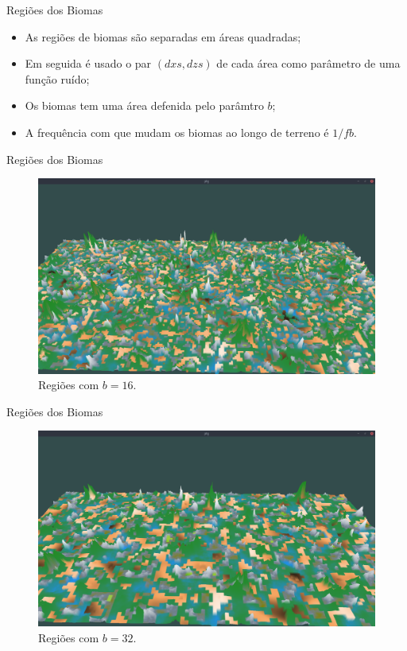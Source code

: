 \begin{frame}{Regiões dos Biomas}
    \begin{itemize} \setlength\itemsep{1em}
        \item As regiões de biomas são separadas em áreas quadradas;
        \item Em seguida é usado o par $(dxs, dzs)$ de cada área como parâmetro 
        de uma função ruído;
        \item Os biomas tem uma área defenida pelo parâmtro $b$;
        \item A frequência com que mudam os biomas ao longo de terreno 
        é $1/fb$.
    \end{itemize}
\end{frame}

\begin{frame}{Regiões dos Biomas}
    \begin{figure}[H]
        \centering
        \includegraphics[width=.9\textwidth]{img/re2bfb/b/16f4.png}
        \caption{Regiões com $b = 16$.}
        \label{fig:img_re2bfb_b_16f4}
    \end{figure}
    
    
\end{frame}

\begin{frame}{Regiões dos Biomas}
    \begin{figure}[H]
        \centering
        \includegraphics[width=.9\textwidth]{img/re2bfb/b/32f4.png}
        \caption{Regiões com $b = 32$.}
        \label{fig:img_re2bfb_b_32f4}
    \end{figure}
    
    
\end{frame}

